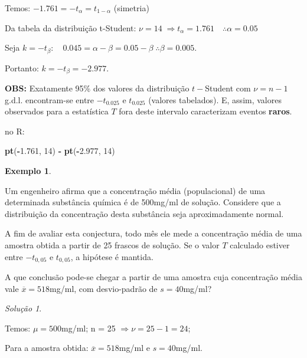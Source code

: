 \documentclass[
]{book}
\newenvironment{Shaded}{\begin{snugshade}}{\end{snugshade}}
\newcommand{\DecValTok}[1]{\textcolor[rgb]{0.00,0.00,0.81}{#1}}
\newcommand{\FloatTok}[1]{\textcolor[rgb]{0.00,0.00,0.81}{#1}}
\newcommand{\KeywordTok}[1]{\textcolor[rgb]{0.13,0.29,0.53}{\textbf{#1}}}
\newcommand{\NormalTok}[1]{#1}
\newcommand{\OperatorTok}[1]{\textcolor[rgb]{0.81,0.36,0.00}{\textbf{#1}}}
\newcommand{\StringTok}[1]{\textcolor[rgb]{0.31,0.60,0.02}{#1}}
\theoremstyle{definition}
\theoremstyle{definition}
\newtheorem{example}{Exemplo}[chapter]
\theoremstyle{definition}
\theoremstyle{remark}
\newtheorem*{solution}{Solução}
\begin{document}
Temos: \(-1.761 = -t_\alpha = t_{1-\alpha}\) (simetria)

Da tabela da distribuição t-Student: \(\nu = 14 \; \Rightarrow t_\alpha = 1.761 \quad \therefore \alpha = 0.05\)

Seja \(k = - t_\beta: \quad 0.045 = \alpha - \beta = 0.05 - \beta \; \therefore \beta = 0.005\).

Portanto: \(k = - t_\beta = - 2.977\).

\textbf{OBS:} Exatamente 95\% dos valores da distribuição \(t-\)Student com \(\nu = n-1\) g.d.l. encontram-se entre \(-t_{0.025}\) e \(t_{0.025}\) (valores tabelados). E, assim, valores observados para a estatística \(T\) fora deste intervalo caracterizam eventos \textbf{raros}.

no R:

\begin{Shaded}
\begin{Highlighting}[]
\KeywordTok{pt}\NormalTok{(}\OperatorTok{-}\FloatTok{1.761}\NormalTok{, }\DecValTok{14}\NormalTok{) }\OperatorTok{-}\StringTok{ }\KeywordTok{pt}\NormalTok{(}\OperatorTok{-}\FloatTok{2.977}\NormalTok{, }\DecValTok{14}\NormalTok{)}
\end{Highlighting}
\end{Shaded}

\begin{example}
\protect\hypertarget{exm:unnamed-chunk-33}{}{\label{exm:unnamed-chunk-33} }
\end{example}

Um engenheiro afirma que a concentração média (populacional) de uma determinada substância química é de 500mg/ml de solução. Considere que a distribuição da concentração desta substância seja aproximadamente normal.

A fim de avaliar esta conjectura, todo mês ele mede a concentração média de uma amostra obtida a partir de 25 frascos de solução. Se o valor \(T\) calculado estiver entre \(-t_{0,05}\) e \(t_{0,05}\), a hipótese é mantida.

A que conclusão pode-se chegar a partir de uma amostra cuja concentração média vale \(\overline{x} = 518\)mg/ml, com desvio-padrão de \(s=40\)mg/ml?

\begin{solution}
{}
\end{solution}

Temos:
\(\mu = 500\)mg/ml; n = 25 \(\Rightarrow \nu = 25-1 = 24\);

Para a amostra obtida: \(\overline{x} = 518\)mg/ml e \(s=40\)mg/ml.
\end{document}
